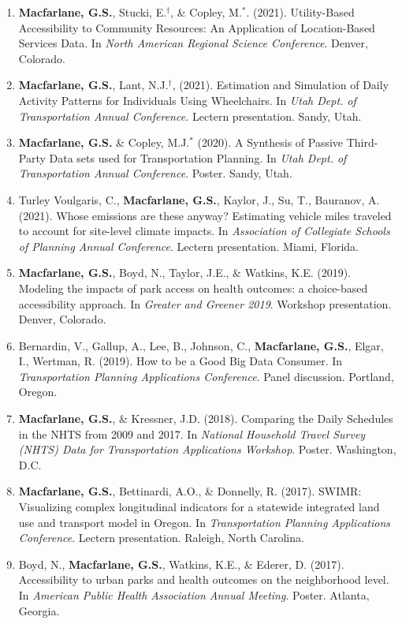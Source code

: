\documentclass[margin,line]{res}
\newcounter{enuminitialize}
\newenvironment{myenum}[1][]
{%
 \setcounter{enuminitialize}{#1}
 \addtocounter{enuminitialize}{2}
 \begin{enumerate}[left= 4pt, itemsep=8pt, start=\value{enuminitialize}, label=\arabic*\addtocounter{enumi}{-2}]
}
{%
 \end{enumerate}
}
\begin{document}
\begin{resume}
\begin{myenum}[35]
\item \textbf{Macfarlane, G.S.}, Stucki,  E.$^\dagger$,  \& Copley, M.$^*$. (2021). Utility-Based Accessibility to Community Resources: An Application of Location-Based Services Data. In \textit{North American Regional Science Conference}. Denver, Colorado.
\item \textbf{Macfarlane, G.S.}, Lant, N.J.$^\dagger$, (2021). Estimation and Simulation of Daily Activity Patterns for Individuals Using Wheelchairs. In \textit{Utah Dept. of Transportation Annual Conference.} Lectern presentation. Sandy, Utah.
\item \textbf{Macfarlane, G.S.} \& Copley, M.J.$^*$ (2020).  A Synthesis of Passive Third-Party Data sets used for Transportation Planning. In \textit{Utah Dept. of Transportation Annual Conference}. Poster. Sandy, Utah.
\item Turley Voulgaris, C., \textbf{Macfarlane, G.S.}, Kaylor, J., Su, T., Bauranov, A. (2021). Whose emissions are these anyway? Estimating vehicle miles traveled to account for site-level climate impacts. In \textit{Association of Collegiate Schools of Planning Annual Conference}. Lectern presentation. Miami, Florida.
\item \textbf{Macfarlane, G.S.}, Boyd, N., Taylor, J.E., \& Watkins, K.E. (2019). Modeling the impacts of park access on health outcomes: a choice-based accessibility approach. In \textit{ Greater and Greener 2019}. Workshop presentation. Denver, Colorado.
\item Bernardin, V., Gallup, A., Lee, B., Johnson, C., \textbf{Macfarlane, G.S.}, Elgar, I., Wertman, R. (2019). How to be a Good Big Data Consumer. In \textit{ Transportation Planning Applications Conference}. Panel discussion. Portland, Oregon.
\item \textbf{Macfarlane, G.S.}, \& Kressner, J.D. (2018). Comparing the Daily Schedules in the NHTS from 2009 and 2017. In \textit{ National Household Travel Survey (NHTS) Data for Transportation Applications Workshop}. Poster. Washington, D.C.
\item \textbf{Macfarlane, G.S.}, Bettinardi, A.O., \& Donnelly, R. (2017). SWIMR: Visualizing complex longitudinal indicators for a statewide integrated land use and transport model in Oregon. In \textit{Transportation Planning Applications Conference}. Lectern presentation. Raleigh, North Carolina.
\item Boyd, N., \textbf{Macfarlane, G.S.}, Watkins, K.E., \& Ederer, D. (2017). Accessibility to urban parks and health outcomes on the neighborhood level. In \textit{ American Public Health Association Annual Meeting}. Poster. Atlanta, Georgia.

\end{myenum}
\end{resume}
\end{document}
